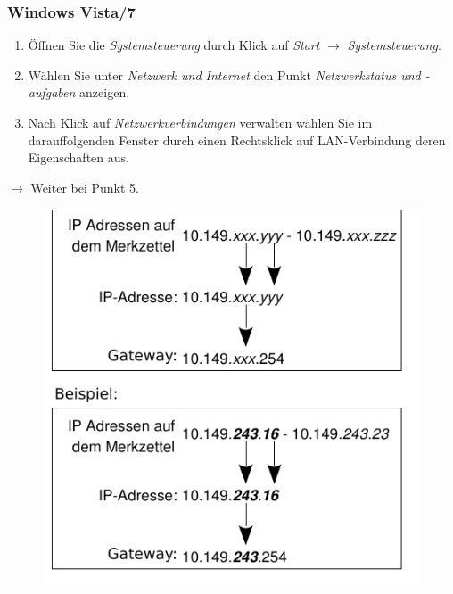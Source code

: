 \documentclass[a4paper,12pt]{scrartcl}
\begin{document}
\subsubsection*{Windows Vista/7}
\begin{enumerate}
    \item Öffnen Sie die \emph{Systemsteuerung} durch Klick auf \emph{Start} $\rightarrow$ \emph{Systemsteuerung}.
    \item Wählen Sie unter \emph{Netzwerk und Internet} den Punkt \emph{Netzwerkstatus und -aufgaben} anzeigen.
    \item Nach Klick auf \emph{Netzwerkverbindungen} verwalten wählen Sie im darauffolgenden Fenster durch einen Rechtsklick auf LAN-Verbindung deren Eigenschaften aus.
\end{enumerate}
$\rightarrow$ Weiter bei Punkt 5.
      \begin{figure}[h!]
	\centering
        \vspace{-5pt}
        \begin{minipage}[c]{0.45\linewidth}
          \centering
          \includegraphics[width=\linewidth,keepaspectratio]{Bilder/IP_Gerneric}
        \end{minipage}
        \begin{minipage}[c]{0.48\linewidth}
          \centering

\end{minipage}
\end{figure}
\end{document}
